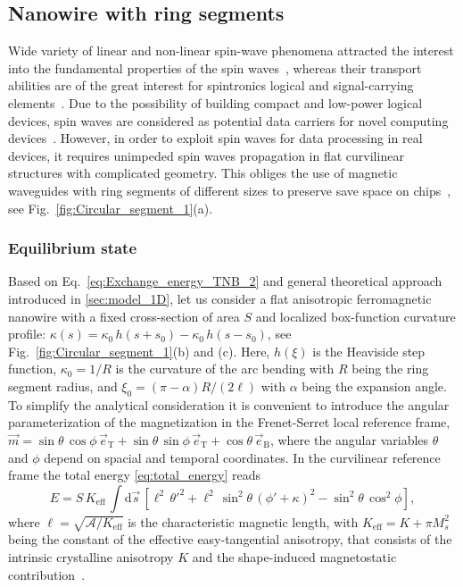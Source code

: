 \subsection{Nanowire with ring segments} \label{subsec:U_wire}

Wide variety of linear and non-linear spin-wave phenomena attracted the interest into the fundamental properties of the spin waves~\cite{Holstein40,Dyson56,Akhiezer68}, whereas their transport abilities are of the great interest for spintronics logical and signal-carrying elements~\cite{Khitun08,Schneider08,Khi10jpd,Vogt12}. Due to the possibility of building compact and low-power logical devices, spin waves are considered as potential data carriers for novel computing devices~\cite{Kruglyak10a,Lenk11,Chumak14,Chumak15,Mahmoud20}. However, in order to exploit spin waves for data processing in real devices, it requires unimpeded spin waves propagation in flat curvilinear structures with complicated geometry. This obliges the use of magnetic waveguides with ring segments of different sizes to preserve save space on chips~\cite{Vogt12,Xing13,Haldar16}, see Fig.~\ref{fig:Circular_segment_1}(a).

\subsubsection{Equilibrium state} \label{subsubsec:U_wire_equilibrium}

Based on Eq.~\ref{eq:Exchange_energy_TNB_2} and general theoretical approach introduced in \ref{sec:model_1D}, let us consider a flat anisotropic ferromagnetic nanowire with a fixed cross-section of area $S$ and localized box-function curvature profile: $\kappa (s) = \kappa_0 \, h(s+s_0) - \kappa_0 \, h(s-s_0)$, see Fig.~\ref{fig:Circular_segment_1}(b) and (c). Here, $h(\xi)$ is the Heaviside step function, $\kappa_0=1/R$ is the curvature of the arc bending with $R$ being the ring segment radius, and $\xi_0 = (\pi-\alpha)R/(2{\ell})$ with $\alpha$ being the expansion angle. To simplify the analytical consideration it is convenient to introduce the angular parameterization of the magnetization in the Frenet-Serret local reference frame, $\vec{m} = \sin\theta \, \cos\phi \, \vec{e}_{\textrm{T}}+\sin\theta \, \sin\phi \, \vec{e}_{\textrm{T}} + \cos\theta \, \vec{e}_{\textrm{B}}$, where the angular variables $\theta $ and $\phi $ depend on spacial and temporal coordinates. In the curvilinear reference frame the total energy \eqref{eq:total_energy} reads 
\begin{equation} \label{eq:Energy-plane}
E = S \, K_\text{eff} \, \int\mathrm{d}\vec{s}\, \left[ \ell^2 \, {\theta'}^2 + \ell^2 \, \sin^2\theta \, \left(\phi'+\kappa\right)^2 - \sin^2\theta\,\cos^2\phi \right],
\end{equation}
where $\ell=\sqrt{\mathcal{A}/K_\text{eff}}$ is the characteristic magnetic length, with $K_\text{eff}=K+\pi M_s^2$ being the constant of the effective easy-tangential anisotropy, that consists of the intrinsic crystalline anisotropy $K$ and the shape-induced magnetostatic contribution~\cite{Gaididei17a}. 

